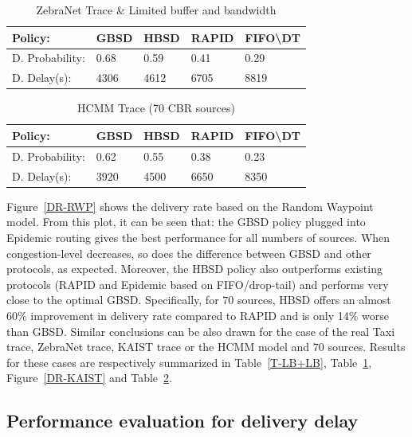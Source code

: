 \begin{table}[!h]
\renewcommand{\arraystretch}{1.1}
\caption{ZebraNet Trace \& Limited buffer and bandwidth}
\centering
\footnotesize
\begin{tabular}{|p{2.5cm}||p{0.9cm}||p{0.9cm}||p{0.9cm}||p{1.5cm}|}
\hline
\bfseries Policy: & GBSD & HBSD & RAPID & FIFO\textbackslash DT\\
\hline\hline
D. Probability:&0.68&0.59&0.41&0.29\\
\hline\hline
D. Delay(s):&4306&4612&6705&8819\\
\hline
\end{tabular}
\label{ZebraNetResults}
\end{table}


\begin{table}[!h]
\renewcommand{\arraystretch}{1.1}
\caption{HCMM Trace (70 CBR sources)}
\centering
\footnotesize
\begin{tabular}{|p{1.8cm}|p{0.9cm}|p{0.9cm}|p{0.9cm}|p{1.5cm}|}
\hline
\bfseries Policy: & GBSD & HBSD & RAPID & FIFO\textbackslash DT\\
\hline
D. Probability:&0.62&0.55&0.38&0.23\\
\hline
D. Delay(s):&3920&4500&6650&8350\\
\hline
\end{tabular}
\label{HCMM-Results}
\end{table}

Figure~\ref{DR-RWP} shows the delivery rate based on the Random Waypoint model. From this plot, it can be seen that: the GBSD policy plugged into Epidemic routing gives the best performance for all numbers of sources. When congestion-level decreases, so does the difference between GBSD and other protocols, as expected. Moreover, the HBSD policy also outperforms existing protocols (RAPID and Epidemic based on FIFO/drop-tail) and performs very close to the optimal GBSD. Specifically, for $70$ sources, HBSD offers an almost 60\% improvement in delivery rate compared to RAPID and is only 14\% worse than GBSD. Similar conclusions can be also drawn for the case of the real Taxi trace,  ZebraNet trace, KAIST trace or the HCMM model and $70$ sources. Results for these cases are respectively summarized in Table~\ref{T-LB+LB}, Table~\ref{ZebraNetResults}, Figure~\ref{DR-KAIST} and Table~\ref{HCMM-Results}.

\subsection{Performance evaluation for delivery delay}
\label{sec:sims:DD}

